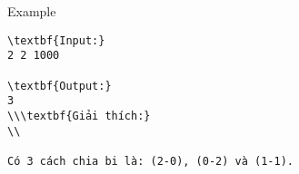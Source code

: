 Example
\begin{verbatim}
\textbf{Input:}
2 2 1000

\textbf{Output:}
3
\\\textbf{Giải thích:}
\\

Có 3 cách chia bi là: (2-0), (0-2) và (1-1).\end{verbatim}